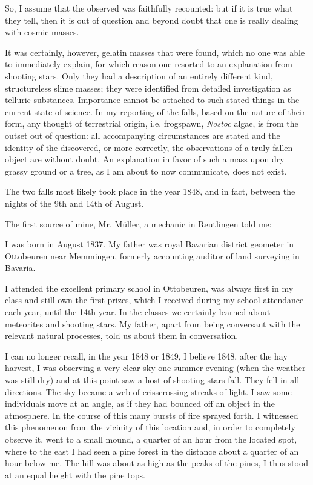 \documentclass[a4paper, 12pt, oneside]{article}
\begin{document}
So, I assume that the observed was faithfully recounted: but if it is true what they tell, then it is out of question and beyond doubt that one is really dealing with cosmic masses.

It was certainly, however, gelatin masses that were found, which no one was able to immediately explain, for which reason one resorted to an explanation from shooting stars. Only they had a description of an entirely different kind, structureless slime masses; they were identified from detailed investigation as telluric substances. Importance cannot be attached to such stated things in the current state of science. In my reporting of the falls, based on the nature of their form, any thought of terrestrial origin, i.e. frogspawn, \emph{Nostoc} algae, is from the outset out of question: all accompanying circumstances are stated and the identity of the discovered, or more correctly, the observations of a truly fallen object are without doubt. An explanation in favor of such a mass upon dry grassy ground or a tree, as I am about to now communicate, does not exist.

The two falls most likely took place in the year 1848, and in fact, between the nights of the 9th and 14th of August.

The first source of mine, Mr. Müller, a mechanic in Reutlingen told me:

I was born in August 1837. My father was royal Bavarian district geometer in Ottobeuren near Memmingen, formerly accounting auditor of land surveying in Bavaria.

I attended the excellent primary school in Ottobeuren, was always first in my class and still own the first prizes, which I received during my school attendance each year, until the 14th year. In the classes we certainly learned about meteorites and shooting stars. My father, apart from being conversant with the relevant natural processes, told us about them in conversation.

I can no longer recall, in the year 1848 or 1849, I believe 1848, after the hay harvest, I was observing a very clear sky one summer evening (when the weather was still dry) and at this point saw a host of shooting stars fall. They fell in all directions. The sky became a web of crisscrossing streaks of light. I saw some individuals move at an angle, as if they had bounced off an object in the atmosphere. In the course of this many bursts of fire sprayed forth. I witnessed this phenomenon from the vicinity of this location and, in order to completely observe it, went to a small mound, a quarter of an hour from the located spot, where to the east I had seen a pine forest in the distance about a quarter of an hour below me. The hill was about as high as the peaks of the pines, I thus stood at an equal height with the pine tops.
\end{document}
